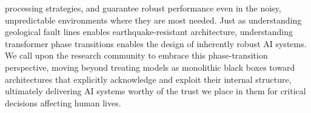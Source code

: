 processing strategies, and guarantee robust performance even in the noisy, unpredictable environments where they are most needed. Just as understanding geological fault lines enables earthquake-resistant architecture, understanding transformer phase transitions enables the design of inherently robust AI systems. We call upon the research community to embrace this phase-transition perspective, moving beyond treating models as monolithic black boxes toward architectures that explicitly acknowledge and exploit their internal structure, ultimately delivering AI systems worthy of the trust we place in them for critical decisions affecting human lives.